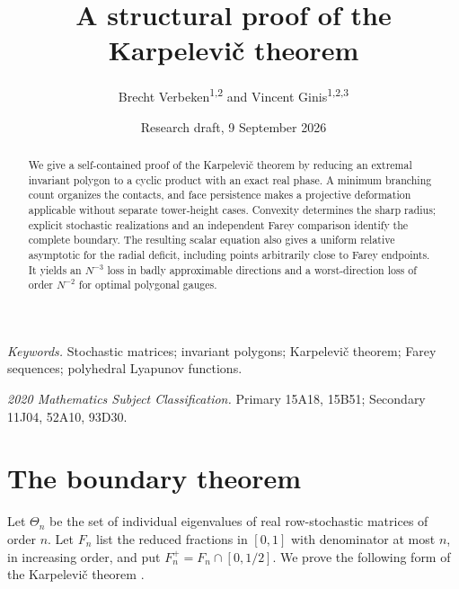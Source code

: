 \documentclass[11pt,a4paper]{article}
\theoremstyle{definition}
\theoremstyle{remark}
\numberwithin{equation}{section}
\begin{document}
\title{A structural proof of the Karpelevi\v{c} theorem}
\author{Brecht Verbeken\textsuperscript{1,2} and Vincent Ginis\textsuperscript{1,2,3}}
\date{Research draft, 9 September 2026}
\maketitle
\begin{abstract}
We give a self-contained proof of the Karpelevi\v{c} theorem by reducing an extremal invariant polygon to a cyclic product with an exact real phase. A minimum branching count organizes the contacts, and face persistence makes a projective deformation applicable without separate tower-height cases. Convexity determines the sharp radius; explicit stochastic realizations and an independent Farey comparison identify the complete boundary. The resulting scalar equation also gives a uniform relative asymptotic for the radial deficit, including points arbitrarily close to Farey endpoints. It yields an $N^{-3}$ loss in badly approximable directions and a worst-direction loss of order $N^{-2}$ for optimal polygonal gauges.
\end{abstract}

\noindent\textit{Keywords.} Stochastic matrices; invariant polygons;
Karpelevi\v{c} theorem; Farey sequences; polyhedral Lyapunov functions.\par
\noindent\textit{2020 Mathematics Subject Classification.}
Primary 15A18, 15B51; Secondary 11J04, 52A10, 93D30.

\section{The boundary theorem}
Let $\Theta_n$ be the set of individual eigenvalues of real row-stochastic matrices of order $n$. Let $F_n$ list the reduced fractions in $[0,1]$ with denominator at most $n$, in increasing order, and put $F_n^+=F_n\cap[0,1/2]$. We prove the following form of the Karpelevi\v{c} theorem \cite{Karp,Ito}.
\end{document}
